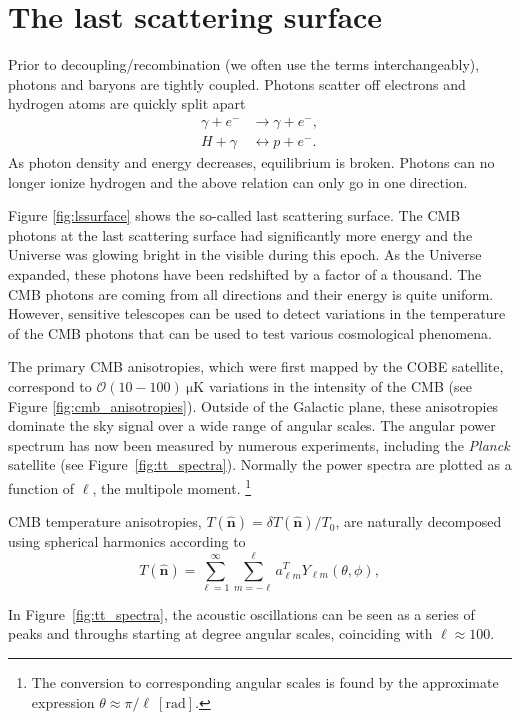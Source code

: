 \documentclass[a4paper,12pt]{article}
\theoremstyle{remark}
\newcommand{\mrm}[1]{\mathrm{#1}}
\renewcommand{\=}[1]{\stackrel{#1}{=}} %
\newcommand{\vhat}[1]{\ensuremath{\mathbf{\hat{#1}}}} %
\theoremstyle{plain}
\theoremstyle{definition}
\begin{document}
\section{The last scattering surface}
Prior to decoupling/recombination (we often use the terms interchangeably), photons and baryons are tightly coupled. Photons scatter off electrons and hydrogen atoms are quickly split apart
\begin{align}
\gamma + e^- &\longrightarrow \gamma + e^-, \\
H + \gamma &\longleftrightarrow p + e^-.
\end{align}
As photon density and energy decreases, equilibrium is broken. Photons can no longer ionize hydrogen and the above relation can only go in one direction.

Figure \ref{fig:lssurface} shows the so-called last scattering surface. The CMB photons at the last scattering surface had significantly more energy and the Universe was glowing bright in the visible during this epoch. As the Universe expanded, these photons have been redshifted by a factor of a thousand. The CMB photons are coming from all directions and their energy is quite uniform. However, sensitive telescopes can be used to detect variations in the temperature of the CMB photons that can be used to test various cosmological phenomena.

The primary CMB anisotropies, which were first mapped by the COBE satellite, correspond to $\mathcal{O}(10-100) \:\mrm{\mu K}$ variations in the intensity of the CMB (see Figure \ref{fig:cmb_anisotropies}). Outside of the Galactic plane, these anisotropies dominate the sky signal over a wide range of angular scales. The angular power spectrum has now been measured by numerous experiments, including the \textit{Planck} satellite (see Figure~\ref{fig:tt_spectra}). Normally the power spectra are plotted as a function of $\ell$, the multipole moment. \footnote{The conversion to corresponding angular scales is found by the approximate expression $\theta \approx \pi / \ell \:[\mrm{rad}]$.}

CMB temperature anisotropies, $T(\vhat{n}) = \delta T(\vhat{n})/T_0$, are naturally decomposed using spherical harmonics according to
\begin{equation}
T(\vhat{n}) = \sum _{\ell =1}^{\infty}\sum _{m=-\ell}^{\ell} a_{\ell m}^T Y_{\ell m} (\theta,\phi),
\label{eq:deltaT}
\end{equation}

In Figure~\ref{fig:tt_spectra}, the acoustic oscillations can be seen as a series of peaks and throughs starting at degree angular scales, coinciding with $\ell \approx 100$. 
\end{document}
